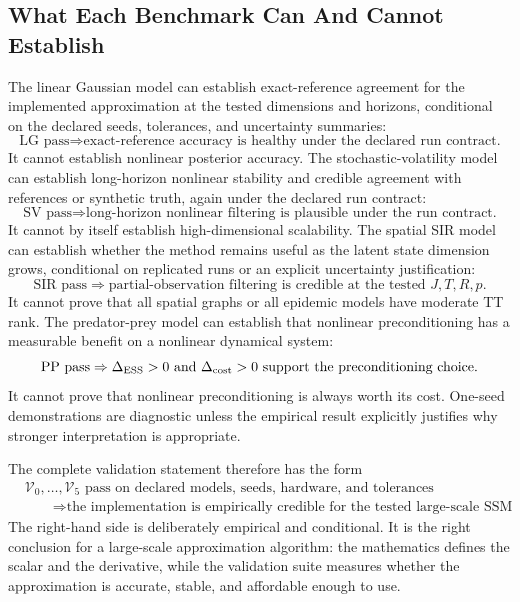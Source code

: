 \documentclass[11pt]{article}
\numberwithin{equation}{section}
\begin{document}
\subsection{What Each Benchmark Can And Cannot Establish}

The linear Gaussian model can establish exact-reference agreement for the
implemented approximation at the tested dimensions and horizons, conditional
on the declared seeds, tolerances, and uncertainty summaries:
\begin{equation}
    \text{LG pass}
    \Rightarrow
    \text{exact-reference accuracy is healthy under the declared run contract.}
    \label{eq:p27-c1}
\end{equation}
It cannot establish nonlinear posterior accuracy.  The stochastic-volatility
model can establish long-horizon nonlinear stability and credible agreement
with references or synthetic truth, again under the declared run contract:
\begin{equation}
    \text{SV pass}
    \Rightarrow
    \text{long-horizon nonlinear filtering is plausible under the run contract.}
    \label{eq:p27-c2}
\end{equation}
It cannot by itself establish high-dimensional scalability.  The spatial SIR
model can establish whether the method remains useful as the latent state
dimension grows, conditional on replicated runs or an explicit uncertainty
justification:
\begin{equation}
    \text{SIR pass}
    \Rightarrow
    \text{partial-observation filtering is credible at the tested }J,T,R,p.
    \label{eq:p27-c3}
\end{equation}
It cannot prove that all spatial graphs or all epidemic models have moderate
TT rank.  The predator-prey model can establish that nonlinear
preconditioning has a measurable benefit on a nonlinear dynamical system:
\begin{equation}
    \text{PP pass}
    \Rightarrow
    \Delta_{\rm ESS}>0
    \text{ and }
    \Delta_{\rm cost}>0
    \text{ support the preconditioning choice.}
    \label{eq:p27-c4}
\end{equation}
It cannot prove that nonlinear preconditioning is always worth its cost.
One-seed demonstrations are diagnostic unless the empirical result explicitly
justifies why stronger interpretation is appropriate.

The complete validation statement therefore has the form
\begin{equation}
\begin{aligned}
&\mathcal V_0,\ldots,\mathcal V_5\text{ pass on declared models, seeds,
hardware, and tolerances}
\\
&\qquad\Longrightarrow
\text{the implementation is empirically credible for the tested large-scale
SSM regimes.}
\end{aligned}
\label{eq:p27-c5}
\end{equation}
The right-hand side is deliberately empirical and conditional.  It is the
right conclusion for a large-scale approximation algorithm: the mathematics
defines the scalar and the derivative, while the validation suite measures
whether the approximation is accurate, stable, and affordable enough to use.
\end{document}
